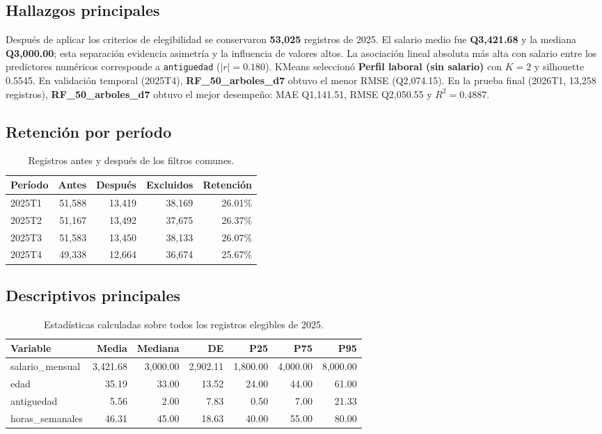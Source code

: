\subsection{Hallazgos principales}
Después de aplicar los criterios de elegibilidad se conservaron \textbf{53,025} registros de 2025. El salario medio fue \textbf{Q3,421.68} y la mediana \textbf{Q3,000.00}; esta separación evidencia asimetría y la influencia de valores altos.
La asociación lineal absoluta más alta con salario entre los predictores numéricos corresponde a \texttt{antiguedad} ($|r|=0.180$).
KMeans seleccionó \textbf{Perfil laboral (sin salario)} con $K=2$ y silhouette 0.5545.
En validación temporal (2025T4), \textbf{RF\_50\_arboles\_d7} obtuvo el menor RMSE (Q2,074.15).
En la prueba final (2026T1, 13,258 registros), \textbf{RF\_50\_arboles\_d7} obtuvo el mejor desempeño: MAE Q1,141.51, RMSE Q2,050.55 y $R^2=0.4887$.
\subsection{Retención por período}
\begin{table}[htbp]\centering\small
\begin{tabular}{lrrrr}\toprule
Período & Antes & Después & Excluidos & Retención \\ \midrule
2025T1 & 51,588 & 13,419 & 38,169 & 26.01\% \\
2025T2 & 51,167 & 13,492 & 37,675 & 26.37\% \\
2025T3 & 51,583 & 13,450 & 38,133 & 26.07\% \\
2025T4 & 49,338 & 12,664 & 36,674 & 25.67\% \\
\bottomrule\end{tabular}
\caption{Registros antes y después de los filtros comunes.}
\end{table}
\subsection{Descriptivos principales}
\begin{table}[htbp]\centering\scriptsize
\begin{tabular}{lrrrrrr}\toprule
Variable & Media & Mediana & DE & P25 & P75 & P95 \\ \midrule
salario\_mensual & 3,421.68 & 3,000.00 & 2,902.11 & 1,800.00 & 4,000.00 & 8,000.00 \\
edad & 35.19 & 33.00 & 13.52 & 24.00 & 44.00 & 61.00 \\
antiguedad & 5.56 & 2.00 & 7.83 & 0.50 & 7.00 & 21.33 \\
horas\_semanales & 46.31 & 45.00 & 18.63 & 40.00 & 55.00 & 80.00 \\
\bottomrule\end{tabular}
\caption{Estadísticas calculadas sobre todos los registros elegibles de 2025.}
\end{table}
